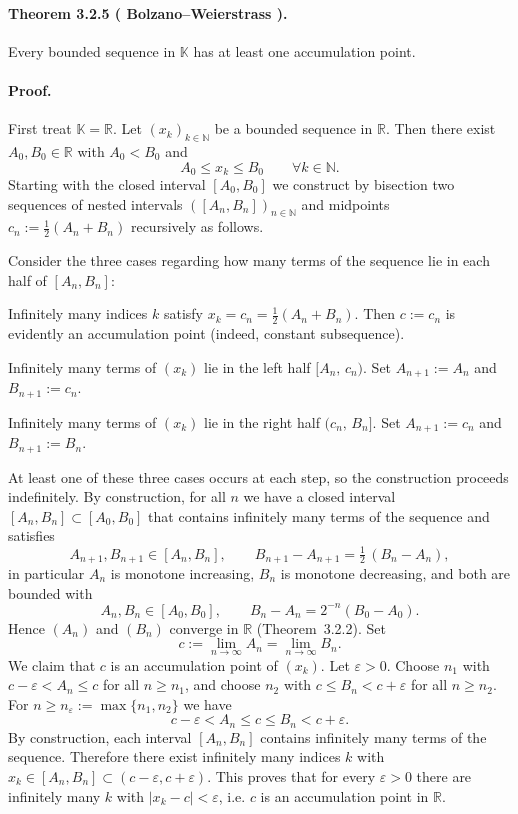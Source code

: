 \documentclass[12pt,a4paper]{article}
\newcommand{\N}{\mathbb{N}}
\newcommand{\R}{\mathbb{R}}
\newcommand{\K}{\mathbb{K}} %
\newcommand{\eps}{\varepsilon}
\newcommand{\NumberedTheorem}[3]{%
\paragraph*{Theorem #1 ( #2 ).} #3\par}
\theoremstyle{plain}
\theoremstyle{definition}
\theoremstyle{remark}
\begin{document}
\NumberedTheorem{3.2.5}{Bolzano--Weierstrass}{Every bounded sequence in $\K$ has at least one accumulation point.}

\paragraph{Proof.} First treat $\K=\R$. Let $(x_k)_{k\in\N}$ be a bounded sequence in $\R$. Then there exist $A_0,B_0\in\R$ with $A_0< B_0$ and
\[
	A_0 \le x_k \le B_0 \qquad \forall k\in\N.
\]
Starting with the closed interval $[A_0,B_0]$ we construct by bisection two sequences of nested intervals $([A_n,B_n])_{n\in\N}$ and midpoints $c_n:=\tfrac12(A_n+B_n)$ recursively as follows.

Consider the three cases regarding how many terms of the sequence lie in each half of $[A_n,B_n]$:
\begin{description}[leftmargin=*]
	\item[Case 1.] Infinitely many indices $k$ satisfy $x_k = c_n = \tfrac12(A_n+B_n)$. Then $c:=c_n$ is evidently an accumulation point (indeed, constant subsequence).

	\item[Case 2.] Infinitely many terms of $(x_k)$ lie in the left half $[A_n,\,c_n)$. Set $A_{n+1}:=A_n$ and $B_{n+1}:=c_n$.

	\item[Case 3.] Infinitely many terms of $(x_k)$ lie in the right half $(c_n,\,B_n]$. Set $A_{n+1}:=c_n$ and $B_{n+1}:=B_n$.
\end{description}
At least one of these three cases occurs at each step, so the construction proceeds indefinitely. By construction, for all $n$ we have a closed interval $[A_n,B_n]\subset [A_0,B_0]$ that contains infinitely many terms of the sequence and satisfies
\[
	A_{n+1},B_{n+1} \in [A_n,B_n], \qquad B_{n+1}-A_{n+1} = \tfrac12\,(B_n-A_n),
\]
in particular \(A_n\) is monotone increasing, \(B_n\) is monotone decreasing, and both are bounded with
\[
	A_n, B_n \in [A_0,B_0], \qquad B_n-A_n = 2^{-n}(B_0-A_0).
\]
Hence $(A_n)$ and $(B_n)$ converge in $\R$ (Theorem~3.2.2). Set
\[
	c := \lim_{n\to\infty} A_n = \lim_{n\to\infty} B_n.
\]
We claim that $c$ is an accumulation point of $(x_k)$. Let $\eps>0$. Choose $n_1$ with $c-\eps < A_n \le c$ for all $n\ge n_1$, and choose $n_2$ with $c\le B_n < c+\eps$ for all $n\ge n_2$. For $n\ge n_\eps:=\max\{n_1,n_2\}$ we have
\[
	c-\eps < A_n \le c \le B_n < c+\eps.
\]
By construction, each interval $[A_n,B_n]$ contains infinitely many terms of the sequence. Therefore there exist infinitely many indices $k$ with $x_k\in [A_n,B_n]\subset (c-\eps, c+\eps)$. This proves that for every $\eps>0$ there are infinitely many $k$ with $|x_k-c|<\eps$, i.e. $c$ is an accumulation point in $\R$.
\end{document}
